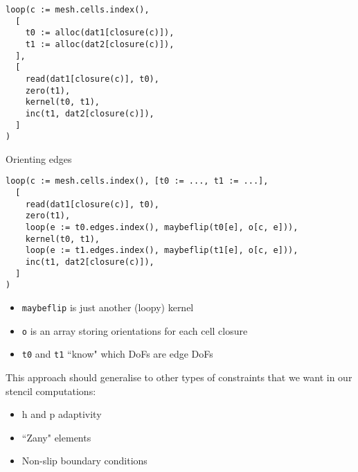 \documentclass[aspectratio=169]{beamer}
\newcommand{\py}{\texttt}
\begin{document}
\begin{frame}[fragile]
  \begin{tcolorbox}
    \begin{verbatim}
loop(c := mesh.cells.index(),
  [
    t0 := alloc(dat1[closure(c)]),
    t1 := alloc(dat2[closure(c)]),
  ],
  [
    read(dat1[closure(c)], t0),
    zero(t1),
    kernel(t0, t1),
    inc(t1, dat2[closure(c)]),
  ]
)
    \end{verbatim}
  \end{tcolorbox}
\end{frame}

\begin{frame}[fragile]{Orienting edges}
  \begin{tcolorbox}
    \begin{verbatim}
loop(c := mesh.cells.index(), [t0 := ..., t1 := ...],
  [
    read(dat1[closure(c)], t0),
    zero(t1),
    loop(e := t0.edges.index(), maybeflip(t0[e], o[c, e])),
    kernel(t0, t1),
    loop(e := t1.edges.index(), maybeflip(t1[e], o[c, e])),
    inc(t1, dat2[closure(c)]),
  ]
)
    \end{verbatim}
  \end{tcolorbox}

  \begin{itemize}
    \item \py{maybeflip} is just another (loopy) kernel
    \item \py{o} is an array storing orientations for each cell closure
    \item \py{t0} and \py{t1} ``know" which DoFs are edge DoFs
  \end{itemize}
\end{frame}

\begin{frame}
  This approach should generalise to other types of constraints that we want in our stencil computations:

  \begin{itemize}
    \item h and p adaptivity
    \item ``Zany" elements
    \item Non-slip boundary conditions
  \end{itemize}
\end{frame}
\end{document}
